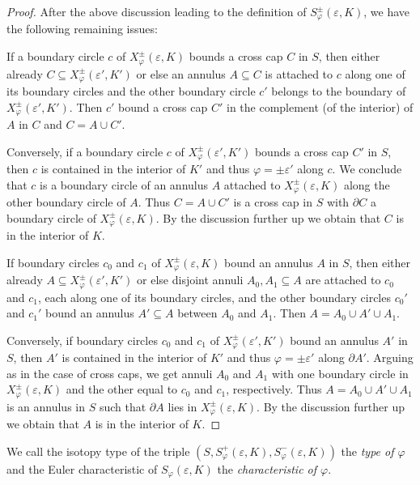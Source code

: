\begin{proof}
After the above discussion leading to the definition of $S_{\varphi}^\pm({\varepsilon},K)$,
we have the following remaining issues: 

If a boundary circle $c$ of $X_{\varphi}^\pm({\varepsilon},K)$ bounds a cross cap $C$ in $S$,
then either already $C\subseteq X_{\varphi}^\pm({\varepsilon}',K')$
or else an annulus $A\subseteq C$ is attached to $c$ along one of its boundary circles
and the other boundary circle $c'$ belongs to the boundary of $X_{\varphi}^\pm({\varepsilon}',K')$.
Then $c'$ bound a cross cap $C'$ in the complement (of the interior) of $A$ in $C$
and $C=A\cup C'$.

Conversely, if a boundary circle $c$ of $X_{\varphi}^\pm({\varepsilon}',K')$ bounds a cross cap $C'$ in $S$,
then $c$ is contained in the interior of $K'$ and thus ${\varphi}=\pm{\varepsilon}'$ along $c$.
We conclude that $c$ is a boundary circle of an annulus $A$ attached to $X_{\varphi}^\pm({\varepsilon},K)$
along the other boundary circle of $A$.
Thus $C=A\cup C'$ is a cross cap in $S$ with $\partial C$
a boundary circle of $X_{\varphi}^\pm({\varepsilon},K)$.
By the discussion further up we obtain that $C$ is in the interior of $K$.

If boundary circles $c_0$ and $c_1$ of $X_{\varphi}^\pm({\varepsilon},K)$ bound an annulus $A$ in $S$,
then either already  $A\subseteq X_{\varphi}^\pm({\varepsilon}',K')$
or else disjoint annuli $A_0,A_1\subseteq A$ are attached to $c_0$ and $c_1$,
each along one of its boundary circles, and the other boundary circles $c_0'$ and $c_1'$
bound an annulus $A'\subseteq A$ between $A_0$ and $A_1$.
Then $A=A_0\cup A'\cup A_1$.

Conversely, if boundary circles $c_0$ and $c_1$ of $X_{\varphi}^\pm({\varepsilon}',K')$
bound an annulus $A'$ in $S$,
then $A'$ is contained in the interior of $K'$ and thus ${\varphi}=\pm{\varepsilon}'$ along $\partial A'$.
Arguing as in the case of cross caps, we get annuli $A_0$ and $A_1$
with one boundary circle in $X_{\varphi}^\pm({\varepsilon},K)$ and the other equal to $c_0$ and $c_1$,
respectively.
Thus $A=A_0\cup A'\cup A_1$ is an annulus in $S$ such that $\partial A$
lies in $X_{\varphi}^\pm({\varepsilon},K)$. 
By the discussion further up we obtain that $A$ is in the interior of $K$.
\end{proof}

We call the isotopy type of the triple $(S,S_{\varphi}^+({\varepsilon},K),S_{\varphi}^-({\varepsilon},K))$
the \emph{type of ${\varphi}$} and the Euler characteristic of $S_{\varphi}({\varepsilon},K)$
the \emph{characteristic of ${\varphi}$}.

